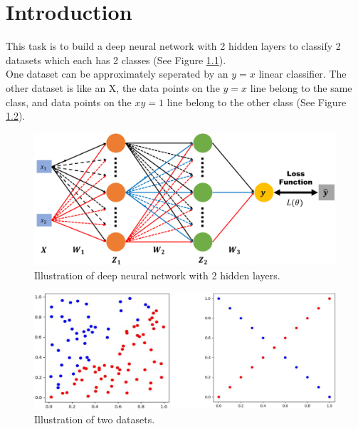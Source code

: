 \chapter{Introduction}
\indent
	This task is to build a deep neural network with 2 hidden layers to classify 2 datasets which each has 2 classes (See Figure \ref{network}). \\
	One dataset can be approximately seperated by an $y = x$ linear classifier. 
	The other dataset is like an X, the data points on the $y = x$ line belong to the same class, 
	and data points on the $xy = 1$ line belong to the other class (See Figure \ref{datasets}).

	\begin{figure}[H]
		\centering
		\includegraphics[scale=0.3]{img/network.png}
		\caption{Illustration of deep neural network with 2 hidden layers.}
		\label{network}
	\end{figure}

	\begin{figure}[H]
		\centering
		\includegraphics[scale=0.3]{img/datasets.png}
		\caption{Illustration of two datasets.}
		\label{datasets}
	\end{figure}